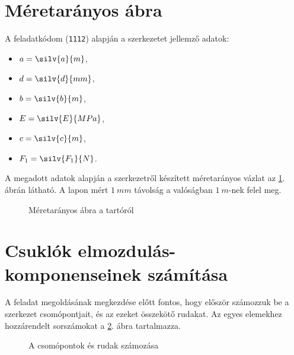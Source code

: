 \documentclass[a4paper, 12pt]{scrartcl}
\begin{document}


\section{Méretarányos ábra} %
\label{sec:Méretarányos ábra}

A feladatkódom (\texttt{1112}) alapján a szerkezetet jellemző adatok:
\begin{multicols}{3}
  \begin{itemize}
    \item $a = \silv{a}{m}$,
    \item $d = \silv{d}{mm}$,

    \item $b = \silv{b}{m}$,
    \item $E = \silv{E}{MPa}$,

    \item $c = \silv{c}{m}$,
    \item $F_1 = \silv{F_1}{N}$.
  \end{itemize}
\end{multicols}

A megadott adatok alapján a szerkezetről készített méretarányos vázlat az
\ref{fig:construction}. ábrán látható. A lapon mért $\SI{1}{mm}$ távolság
a valóságban $\SI{1}{m}$-nek felel meg.

\begin{figure}[H]
  \centering
  
  \caption{Méretarányos ábra a tartóról}
  \label{fig:construction}
\end{figure}


\section{Csuklók elmozdulás-komponenseinek számítása} %
\label{sec:Csuklók elmozdulás-komponenseinek számítása}

A feladat megoldásának megkezdése előtt fontos, hogy először számozzuk be
a szerkezet csomópontjait, és az ezeket összekötő rudakat. Az egyes elemekhez
hozzárendelt sorszámokat a \ref{fig:numbering}. ábra tartalmazza.

\begin{figure}[H]
  \centering
  
  \caption{A csomópontok és rudak számozása}
  \label{fig:numbering}
\end{figure}
\end{document}
